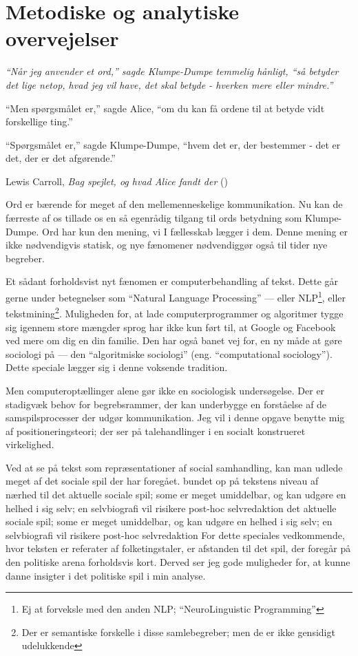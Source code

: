 \part{Metodiske og analytiske overvejelser}\label{part:method}

\epigraph{\itshape
“Når jeg anvender et ord,” sagde Klumpe-Dumpe temmelig hånligt, “så betyder det lige netop, hvad jeg vil have, det skal betyde - hverken mere eller mindre.”

“Men spørgsmålet er,” sagde Alice, “om du kan få ordene til at betyde vidt forskellige ting.”

“Spørgsmålet er,” sagde Klumpe-Dumpe, “hvem det er, der bestemmer - det er det, der er det afgørende.”
}{Lewis Carroll, \textit{Bag spejlet, og hvad Alice fandt der} (\citeyear{carrollAliceEventyrlandOg1977})}

Ord er bærende for meget af den mellemenneskelige kommunikation.
Nu kan de færreste af os tillade os en så egenrådig tilgang til ords betydning som Klumpe-Dumpe.
Ord har kun den mening, vi I fællesskab lægger i dem.
Denne mening er ikke nødvendigvis statisk, og nye fænomener nødvendiggør også til tider nye begreber.


Et sådant forholdsvist nyt fænomen er computerbehandling af tekst.
Dette går gerne under betegnelser som “Natural Language Processing” — eller NLP\footnote{Ej at forveksle med den anden NLP; “NeuroLinguistic Programming”}, eller tekstmining\footnote{Der er semantiske forskelle i disse samlebegreber; men de er ikke gensidigt udelukkende}.
Muligheden for, at lade computerprogrammer og algoritmer tygge sig igennem store mængder sprog har ikke kun ført til, at Google og Facebook ved mere om dig en din familie.
Den har også banet vej for, en ny måde at gøre sociologi på — den “algoritmiske sociologi” (eng. “computational sociology”).
Dette speciale lægger sig i denne voksende tradition.

Men computeroptællinger alene gør ikke en sociologisk undersøgelse.
Der er stadigvæk behov for begrebsrammer, der kan underbygge en forståelse af de samspilsprocesser der udgør kommunikation.
Jeg vil i denne opgave benytte mig af positioneringsteori; der ser på talehandlinger i en socialt konstrueret virkelighed.


Ved at se på tekst som repræsentationer af social samhandling, kan man udlede meget af det sociale spil der har foregået.
bundet op på tekstens niveau af nærhed til det aktuelle sociale spil; some er meget umiddelbar, og kan udgøre en helhed i sig selv; en selvbiografi vil risikere post-hoc selvredaktion det aktuelle sociale spil; some er meget umiddelbar, og kan udgøre en helhed i sig selv; en selvbiografi vil risikere post-hoc selvredaktion
For dette speciales vedkommende, hvor teksten er referater af folketingstaler, er afstanden til det spil, der foregår på den politiske arena forholdsvis kort.
Derved ser jeg gode muligheder for, at kunne danne insigter i det politiske spil i min analyse.



